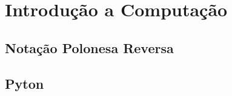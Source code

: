 \chapter{Introdução a Computação}














\section{Notação Polonesa Reversa}

\section{Pyton}

